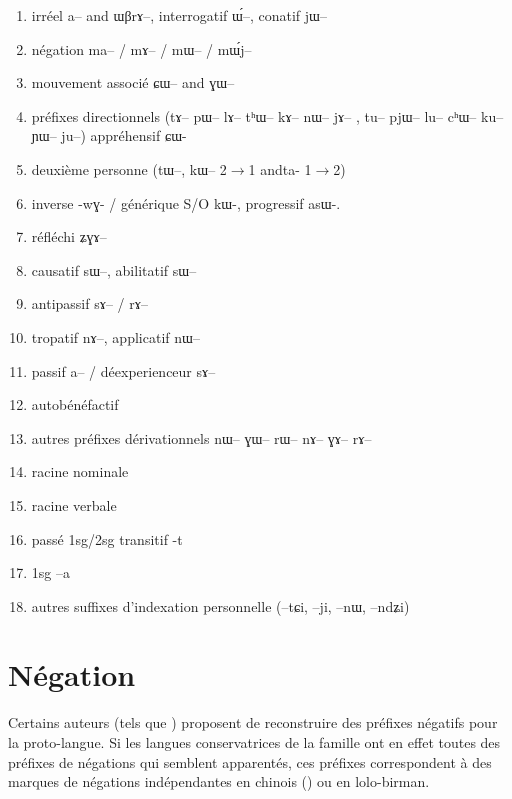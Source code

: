 \documentclass[oldfontcommands,oneside,a4paper,11pt]{article}
\newcommand{\ipa}[1]{{\phon \mbox{#1}}} %
\begin{document}
\begin{landscape}
\begin{multicols}{2}
\begin{enumerate}
\item irréel  \ipa{a}-- and \ipa{ɯβrɤ}--, interrogatif \ipa{ɯ́}--, conatif \ipa{jɯ}--
\item négation \ipa{ma}-- / \ipa{mɤ}-- / \ipa{mɯ}-- / \ipa{mɯ́j}--
\item  mouvement associé  \ipa{ɕɯ}-- and \ipa{ɣɯ}-- 
\item préfixes directionnels (\ipa{tɤ}--  \ipa{pɯ}--  \ipa{lɤ}--   \ipa{tʰɯ}--  \ipa{kɤ}--   \ipa{nɯ}--   \ipa{jɤ}-- ,  \ipa{tu}--   \ipa{pjɯ}--   \ipa{lu}--   \ipa{cʰɯ}--   \ipa{ku}--   \ipa{ɲɯ}--   \ipa{ju}--)   appréhensif \ipa{ɕɯ}-
\item deuxième personne (\ipa{tɯ}--, \ipa{kɯ}-- 2$\rightarrow$1 and\ipa{ta-} 1$\rightarrow$2)
\item inverse -\ipa{wɣ}- / générique S/O \ipa{kɯ}-, progressif \ipa{asɯ}-. 
\item réfléchi \ipa{ʑɣɤ}-- 
\item causatif \ipa{sɯ}--, abilitatif \ipa{sɯ}--
\item  antipassif  \ipa{sɤ}-- / \ipa{rɤ}--
\item  tropatif \ipa{nɤ}--, applicatif \ipa{nɯ}--
\item passif \ipa{a}-- / déexperienceur \ipa{sɤ}--
\item autobénéfactif
\item autres préfixes dérivationnels \ipa{nɯ}-- \ipa{ɣɯ}-- \ipa{rɯ}-- \ipa{nɤ}-- \ipa{ɣɤ}-- \ipa{rɤ}--
\item racine nominale
\item racine verbale
\item passé 1sg/2sg transitif -\ipa{t} 
\item 1sg --\ipa{a}
\item autres suffixes d'indexation personnelle (--\ipa{tɕi}, --\ipa{ji}, --\ipa{nɯ}, --\ipa{ndʑi})
\end{enumerate}


\end{multicols}
  \end{landscape}

 



\section{Négation} 
Certains auteurs (tels que \citealt{lapolla03}) proposent de reconstruire des préfixes négatifs pour la proto-langue. Si les langues conservatrices de la famille ont en effet toutes des préfixes de négations qui semblent apparentés, ces préfixes correspondent à des marques de négations indépendantes en chinois (\citealt{djamouri91negation}) ou en lolo-birman. 
\end{document}
